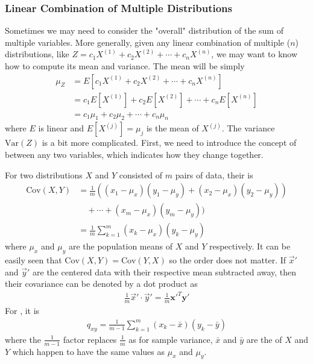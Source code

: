 \subsubsection{Linear Combination of Multiple Distributions}
Sometimes we may need to consider the "overall" distribution of the sum of multiple variables. More generally, given any linear combination of multiple ($n$) distributions, like $Z = c_1X^{(1)} + c_2X^{(2)} + \cdots + c_nX^{(n)}$, we may want to know how to compute its mean and variance. The mean will be simply 
\begin{align}
\mu_Z &= E[c_1X^{(1)} + c_2X^{(2)} + \cdots + c_nX^{(n)}] \nonumber \\
&= c_1E[X^{(1)}] + c_2E[X^{(2)}] + \cdots + c_nE[X^{(n)}] \nonumber \\
&= c_1\mu_1 + c_2\mu_2 + \cdots + c_n\mu_n     
\end{align}
where $E$ is linear and $E[X^{(j)}] = \mu_j$ is the mean of $X^{(j)}$. The variance $\text{Var}(Z)$ is a bit more complicated. First, we need to introduce the concept of  between any two variables, which indicates how they change together.
\begin{defn}
\label{defn:covariance}
For two distributions $X$ and $Y$ consisted of $m$ pairs of data, their  is
\begin{align}
\text{Cov}(X,Y) &= \frac{1}{m}((x_1-\mu_x)(y_1-\mu_y) + (x_2-\mu_x)(y_2-\mu_y)) \nonumber \\
&\quad + \cdots + (x_m-\mu_x)(y_m-\mu_y)) \nonumber \\
&= \frac{1}{m}\sum_{k=1}^{m} (x_k-\mu_x)(y_k-\mu_y) \label{eqn:covsumprod}
\end{align}
where $\mu_x$ and $\mu_y$ are the population means of $X$ and $Y$ respectively. It can be easily seen that $\text{Cov}(X,Y) = \text{Cov}(Y,X)$ so the order does not matter. If $\vec{x}'$ and $\vec{y}'$ are the centered data with their respective mean subtracted away, then their covariance can be denoted by a dot product as
\begin{align}
\frac{1}{m} \vec{x}' \cdot \vec{y}' = \frac{1}{m} \textbf{x}'^T \textbf{y}' \label{eqn:covdot}
\end{align}
For , it is
\begin{align}
q_{xy} = \frac{1}{m-1} \sum_{k=1}^{m} (x_k-\bar{x})(y_k-\bar{y})
\end{align}
where the $\frac{1}{m-1}$ factor replaces $\frac{1}{m}$ as for sample variance, $\bar{x}$ and $\bar{y}$ are the  of $X$ and $Y$ which happen to have the same values as $\mu_x$ and $\mu_y$.
\end{defn}
